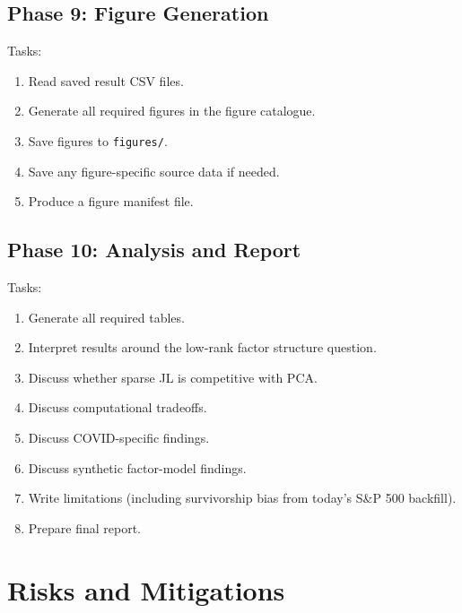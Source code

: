 \documentclass[11pt]{article}
\begin{document}
\subsection{Phase 9: Figure Generation}

Tasks:

\begin{enumerate}
    \item Read saved result CSV files.
    \item Generate all required figures in the figure catalogue.
    \item Save figures to \texttt{figures/}.
    \item Save any figure-specific source data if needed.
    \item Produce a figure manifest file.
\end{enumerate}

\subsection{Phase 10: Analysis and Report}

Tasks:

\begin{enumerate}
    \item Generate all required tables.
    \item Interpret results around the low-rank factor structure question.
    \item Discuss whether sparse JL is competitive with PCA.
    \item Discuss computational tradeoffs.
    \item Discuss COVID-specific findings.
    \item Discuss synthetic factor-model findings.
    \item Write limitations (including survivorship bias from today's S\&P 500 backfill).
    \item Prepare final report.
\end{enumerate}

\section{Risks and Mitigations}\label{sec:risks}
\end{document}
